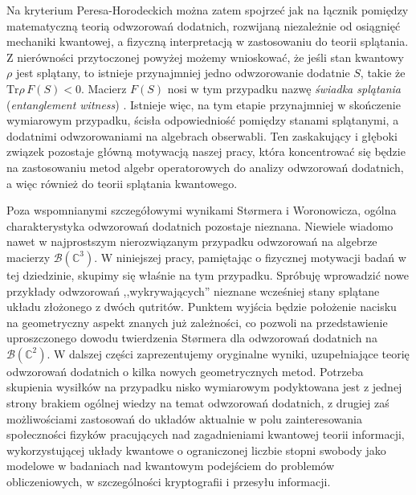 Na kryterium Peresa-Horodeckich można zatem spojrzeć jak na łącznik pomiędzy
matematyczną teorią odwzorowań dodatnich,
rozwijaną niezależnie od osiągnięć mechaniki kwantowej,
a fizyczną interpretacją w zastosowaniu do teorii splątania.
Z nierówności przytoczonej powyżej %
możemy wnioskować,
że jeśli stan kwantowy $\rho$ jest splątany,
to istnieje przynajmniej jedno odwzorowanie dodatnie $S$,
takie że $\text{Tr} \rho \, F(S) < 0$.
Macierz $F(S)$ nosi w tym przypadku nazwę
\emph{świadka splątania} (\emph{entanglement witness})
\cite{bourennane2004experimental}.
Istnieje więc,
na tym etapie przynajmniej w skończenie wymiarowym przypadku,
ścisła odpowiedniość pomiędzy stanami splątanymi,
a dodatnimi odwzorowaniami na algebrach obserwabli.
Ten zaskakujący i głęboki związek pozostaje główną motywacją naszej pracy,
która koncentrować się będzie na zastosowaniu metod algebr operatorowych
do analizy odwzorowań dodatnich,
a więc również do teorii splątania kwantowego.

Poza wspomnianymi szczegółowymi wynikami St{\o}rmera i Woronowicza,
ogólna charakterystyka odwzorowań dodatnich pozostaje nieznana.
Niewiele wiadomo nawet w najprostszym nierozwiązanym przypadku odwzorowań
na algebrze macierzy $\mathcal{B}(\mathbb{C}^{3})$.
W niniejszej pracy,
pamiętając o fizycznej motywacji badań w tej dziedzinie,
skupimy się właśnie na tym przypadku.
Spróbuję wprowadzić nowe przykłady odwzorowań
,,wykrywających'' nieznane wcześniej stany splątane układu złożonego
z dwóch qutritów.
Punktem wyjścia będzie położenie nacisku na geometryczny aspekt znanych
już zależności,
co pozwoli na przedstawienie uproszczonego dowodu twierdzenia St{\o}rmera
dla odwzorowań dodatnich na $\mathcal{B}(\mathbb{C}^{2})$.
W dalszej części zaprezentujemy oryginalne wyniki,
uzupełniające teorię odwzorowań dodatnich o kilka nowych geometrycznych metod.
Potrzeba skupienia wysiłków na przypadku nisko wymiarowym podyktowana jest
z jednej strony brakiem ogólnej wiedzy na temat odwzorowań dodatnich,
z drugiej zaś możliwościami zastosowań do układów aktualnie w polu zainteresowania
społeczności fizyków pracujących nad zagadnieniami kwantowej teorii informacji,
wykorzystującej układy kwantowe o ograniczonej liczbie stopni swobody
jako modelowe w badaniach nad kwantowym podejściem do problemów obliczeniowych,
w szczególności kryptografii i przesyłu informacji.

